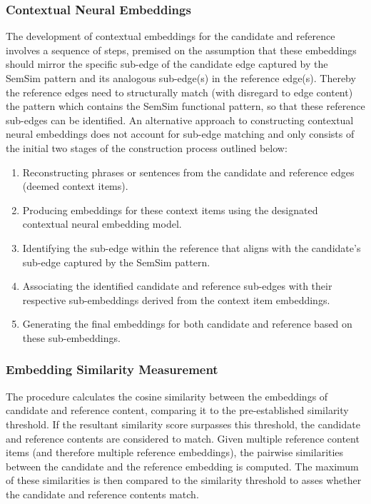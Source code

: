 \documentclass[11pt]{scrreprt}
\begin{document}
\subsubsection{Contextual Neural Embeddings}
The development of contextual embeddings for the candidate and reference involves a sequence of steps, premised on the assumption that these embeddings should mirror the specific sub-edge of the candidate edge captured by the SemSim pattern and its analogous sub-edge(s) in the reference edge(s). Thereby the reference edges need to structurally match (with disregard to edge content) the pattern which contains the SemSim functional pattern, so that these reference sub-edges can be identified. An alternative approach to constructing contextual neural embeddings does not account for sub-edge matching and only consists of the initial two stages of the construction process outlined below:

\begin{enumerate}
	\item Reconstructing phrases or sentences from the candidate and reference edges (deemed context items).
    \item Producing embeddings for these context items using the designated contextual neural embedding model.
    \item Identifying the sub-edge within the reference that aligns with the candidate's sub-edge captured by the SemSim pattern.
    \item Associating the identified candidate and reference sub-edges with their respective sub-embeddings derived from the context item embeddings.
    \item Generating the final embeddings for both candidate and reference based on these sub-embeddings.
\end{enumerate}
    
\subsubsection{Embedding Similarity Measurement}
The procedure calculates the cosine similarity between the embeddings of candidate and reference content, comparing it to the pre-established similarity threshold. If the resultant similarity score surpasses this threshold, the candidate and reference contents are considered to match. Given multiple reference content items (and therefore multiple reference embeddings), the pairwise similarities between the candidate and the reference embedding is computed. The maximum of these similarities is then compared to the similarity threshold to asses whether the candidate and reference contents match.
\end{document}
